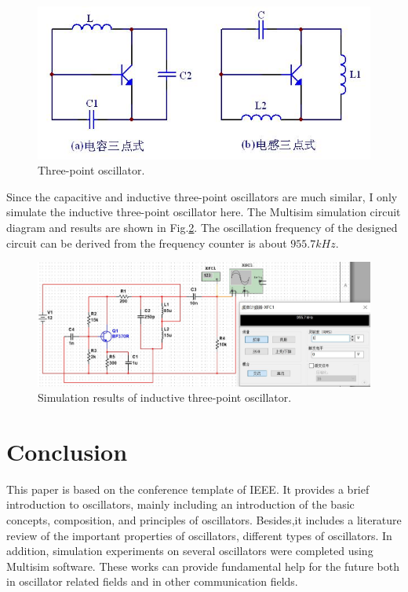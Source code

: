\documentclass[conference]{IEEEtran}
\begin{document}
\begin{figure}[!h]
\centerline{\includegraphics[scale=0.35]{fig/pic5-23.jpg}}
\caption{Three-point oscillator.}
\label{fig5-23}
\end{figure}

Since the capacitive and inductive three-point oscillators are much similar, I only simulate the inductive three-point oscillator here. The Multisim simulation circuit diagram and results are shown in Fig.\ref{fig5-24}. The oscillation frequency of the designed circuit can be derived from the frequency counter is about $955.7kHz$. 

\begin{figure}[!h]
\centerline{\includegraphics[scale=0.2]{fig/pic5-24.jpg}}
\caption{Simulation results of inductive three-point oscillator.}
\label{fig5-24}
\end{figure}

\section{Conclusion}\label{sec6}
This paper is based on the conference template of IEEE. It provides a brief introduction to oscillators, mainly including an introduction of the basic concepts, composition, and principles of oscillators. Besides,it includes a literature review of the important properties of oscillators, different types of oscillators. In addition, simulation experiments on several oscillators were completed using Multisim software. These works can provide fundamental help for the future both in oscillator related fields and in other communication fields.
\end{document}
